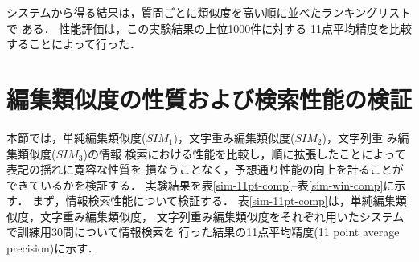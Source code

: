 システムから得る結果は，質問ごとに類似度を高い順に並べたランキングリストで
ある．
性能評価は，この実験結果の上位1000件に対する
11点平均精度を比較することによって行った．

\section{編集類似度の性質および検索性能の検証} \label{comp-sim}

本節では，単純編集類似度($SIM_1$)，文字重み編集類似度($SIM_2$)，文字列重
み編集類似度($SIM_3$)の情報
検索における性能を比較し，順に拡張したことによって表記の揺れに寛容な性質を
損なうことなく，予想通り性能の向上を計ることができているかを検証する．
実験結果を表\ref{sim-11pt-comp}--表\ref{sim-win-comp}に示す．
まず，情報検索性能について検証する．
表\ref{sim-11pt-comp}は，単純編集類似度，文字重み編集類似度，
文字列重み編集類似度をそれぞれ用いたシステムで訓練用30問について情報検索を
行った結果の11点平均精度(11 point average precision)に示す．
